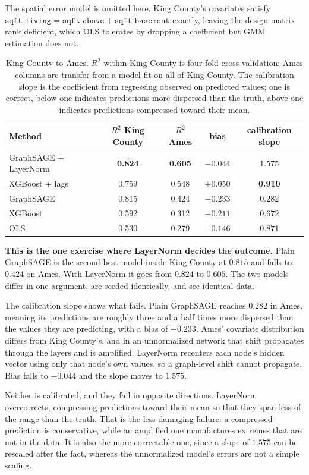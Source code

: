 \documentclass[ASNA, twocolumn]{USG} %
\begin{document}
The spatial error model is omitted here. King County's covariates satisfy \(\texttt{sqft\_living} = \texttt{sqft\_above} + \texttt{sqft\_basement}\) exactly, leaving the design matrix rank deficient, which OLS tolerates by dropping a coefficient but GMM estimation does not.

\begin{table}[t]
\centering
\caption{King County to Ames. \(R^2\) within King County is four-fold cross-validation; Ames columns are transfer from a model fit on all of King County. The calibration slope is the coefficient from regressing observed on predicted values; one is correct, below one indicates predictions more dispersed than the truth, above one indicates predictions compressed toward their mean.}
\label{tab:kc_ames}
\begin{tabular}{lcccc}
\toprule
Method & \(R^2\) King County & \(R^2\) Ames & bias & calibration slope \\
\midrule
GraphSAGE + LayerNorm & \textbf{0.824} & \textbf{0.605} & \(-0.044\) & 1.575 \\
XGBoost + lags & 0.759 & 0.548 & \(+0.050\) & \textbf{0.910} \\
GraphSAGE & 0.815 & 0.424 & \(-0.233\) & 0.282 \\
XGBoost & 0.592 & 0.312 & \(-0.211\) & 0.672 \\
OLS & 0.530 & 0.279 & \(-0.146\) & 0.871 \\
\bottomrule
\end{tabular}
\end{table}

\textbf{This is the one exercise where LayerNorm decides the outcome.} Plain GraphSAGE is the second-best model inside King County at \(0.815\) and falls to \(0.424\) on Ames. With LayerNorm it goes from \(0.824\) to \(0.605\). The two models differ in one argument, are seeded identically, and see identical data.

The calibration slope shows what fails. Plain GraphSAGE reaches \(0.282\) in Ames, meaning its predictions are roughly three and a half times more dispersed than the values they are predicting, with a bias of \(-0.233\). Ames' covariate distribution differs from King County's, and in an unnormalized network that shift propagates through the layers and is amplified. LayerNorm recenters each node's hidden vector using only that node's own values, so a graph-level shift cannot propagate. Bias falls to \(-0.044\) and the slope moves to \(1.575\).

Neither is calibrated, and they fail in opposite directions. LayerNorm overcorrects, compressing predictions toward their mean so that they span less of the range than the truth. That is the less damaging failure: a compressed prediction is conservative, while an amplified one manufactures extremes that are not in the data. It is also the more correctable one, since a slope of \(1.575\) can be rescaled after the fact, whereas the unnormalized model's errors are not a simple scaling.
\end{document}
